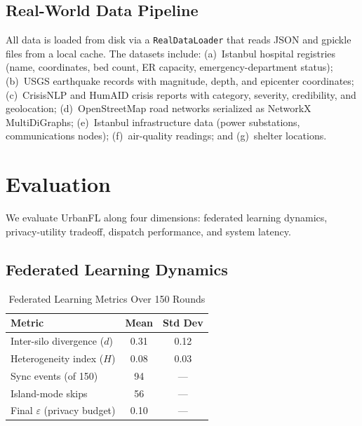 \documentclass[conference]{IEEEtran}
\begin{document}
\subsection{Real-World Data Pipeline}

All data is loaded from disk via a \texttt{RealDataLoader} that reads JSON and gpickle files from a local cache. The datasets include: (a)~Istanbul hospital registries (name, coordinates, bed count, ER capacity, emergency-department status); (b)~USGS earthquake records with magnitude, depth, and epicenter coordinates; (c)~CrisisNLP and HumAID crisis reports with category, severity, credibility, and geolocation; (d)~OpenStreetMap road networks serialized as NetworkX MultiDiGraphs; (e)~Istanbul infrastructure data (power substations, communications nodes); (f)~air-quality readings; and (g)~shelter locations.

\section{Evaluation}

We evaluate UrbanFL along four dimensions: federated learning dynamics, privacy-utility tradeoff, dispatch performance, and system latency.

\subsection{Federated Learning Dynamics}

\begin{table}[htbp]
\caption{Federated Learning Metrics Over 150 Rounds}
\begin{center}
\begin{tabular}{lcc}
\toprule
\textbf{Metric} & \textbf{Mean} & \textbf{Std Dev} \\
\midrule
Inter-silo divergence ($d$) & 0.31 & 0.12 \\
Heterogeneity index ($H$) & 0.08 & 0.03 \\
Sync events (of 150) & 94 & --- \\
Island-mode skips & 56 & --- \\
Final $\varepsilon$ (privacy budget) & 0.10 & --- \\
\bottomrule
\end{tabular}
\label{tab:fl}
\end{center}
\end{table}
\end{document}
